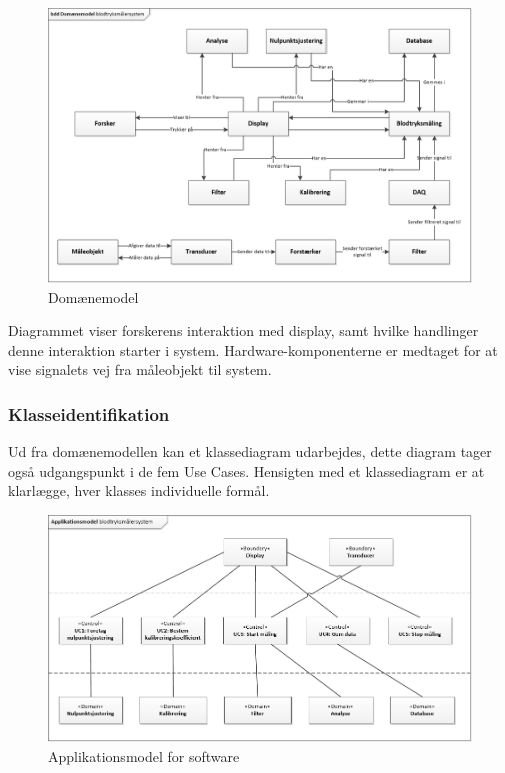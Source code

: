 \begin{figure}[H]
	\centering
	\includegraphics[width=1.0\textwidth]{Figurer/DomaneModel}
	\caption{Domænemodel}
	\label{fig:Domaenemodel}
\end{figure}
Diagrammet viser forskerens interaktion med display, samt hvilke handlinger denne interaktion starter i system. Hardware-komponenterne er medtaget for at vise signalets vej fra måleobjekt til system. 

\subsubsection{Klasseidentifikation}
Ud fra domænemodellen kan et klassediagram udarbejdes, dette diagram tager også udgangspunkt i de fem Use Cases. Hensigten med et klassediagram er at klarlægge, hver klasses individuelle formål. 

\begin{figure}[H]
	\centering
	\includegraphics[width=1.0\textwidth]{Figurer/Applikationsmodel}
	\caption{Applikationsmodel for software}
	\label{fig:Applikationsmodellen}
\end{figure}

